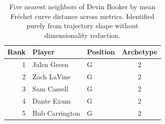 \begin{table}[htbp]
  \centering\small
  \begin{tabular}{rllc}
    \toprule
    Rank & Player & Position & Archetype \\
    \midrule
    1 & Jalen Green & G & 2 \\
    2 & Zach LaVine & G & 2 \\
    3 & Sam Cassell & G & 2 \\
    4 & Dante Exum & G & 2 \\
    5 & Bub Carrington & G & 2 \\
    \bottomrule
  \end{tabular}
  \caption{Five nearest neighbors of Devin Booker by mean Fr\'{e}chet curve distance across metrics. Identified purely from trajectory shape without dimensionality reduction.}
  \label{tab:Devin_Booker_frechet_curve_neighbors}
\end{table}

